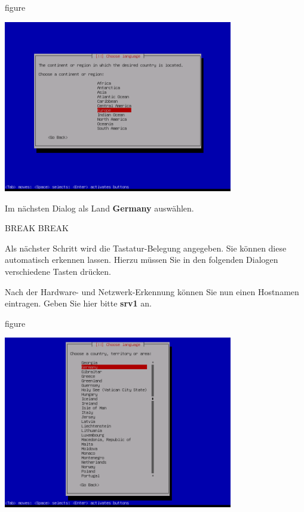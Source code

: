 \begin{nofloat}{figure}
\begin{center}
\includegraphics[width=0.75\textwidth]{screenshots/04_ubuntu_install.png}
\end{center}
\end{nofloat}

Im nächsten Dialog als Land \textbf{Germany} auswählen.


BREAK BREAK

Als nächster Schritt wird die Tastatur-Belegung angegeben. Sie können diese automatisch erkennen lassen. Hierzu müssen Sie in
den folgenden Dialogen verschiedene Tasten drücken.

Nach der Hardware- und Netzwerk-Erkennung können Sie nun einen Hostnamen eintragen. Geben Sie hier bitte \textbf{srv1} an.

\begin{nofloat}{figure}
\begin{center}
\includegraphics[width=0.75\textwidth]{screenshots/05_ubuntu_install.png}
\end{center}
\end{nofloat}

